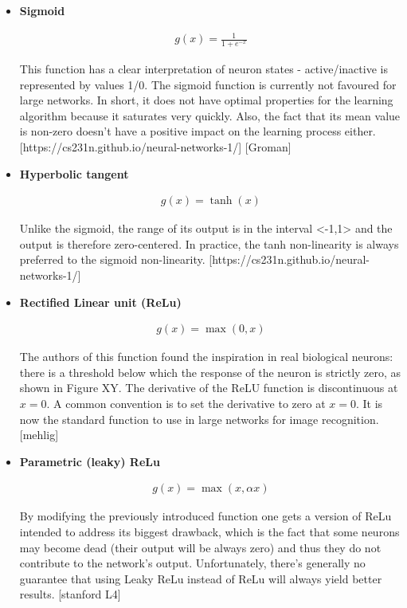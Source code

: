 \begin{itemize}

\item \textbf{Sigmoid}

\begin{gather}
	g(x)=\frac{1}{1 + e^{-x}}
\end{gather}

This function has a clear interpretation of neuron states - active/inactive is represented by values 1/0. The sigmoid function is currently not favoured for large networks. In short, it does not have optimal properties for the learning algorithm because it saturates very quickly. Also, the fact that its mean value is non-zero doesn't have a positive impact on the learning process either. [https://cs231n.github.io/neural-networks-1/] [Groman]

\item \textbf{Hyperbolic tangent}

\begin{gather}
	g(x)=\tanh (x)
\end{gather}

Unlike the sigmoid, the range of its output is in the interval <-1,1> and the output is therefore zero-centered. In practice, the tanh non-linearity is always preferred to the sigmoid non-linearity. [https://cs231n.github.io/neural-networks-1/]

\item \textbf{Rectified Linear unit (ReLu)}

\begin{gather}
	g(x)=\max (0,x)
\end{gather}

The authors of this function found the inspiration in real biological neurons: there is a threshold below which the response of the neuron is strictly zero, as shown in Figure XY. The derivative of the ReLU function is discontinuous at $ x=0 $. A common convention is to set the derivative to zero at $ x=0 $. It is now the standard function to use in large networks for image recognition. [mehlig]

\item \textbf{Parametric (leaky) ReLu}

\begin{gather}
	g(x)=\max(x,\alpha x)
\end{gather}

By modifying the previously introduced function one gets a version of ReLu intended to address its biggest drawback, which is the fact that some neurons may become dead (their output will be always zero) and thus they do not contribute to the network's output. Unfortunately, there's generally no guarantee that using Leaky ReLu instead of ReLu will always yield better results. [stanford L4]


\end{itemize}
